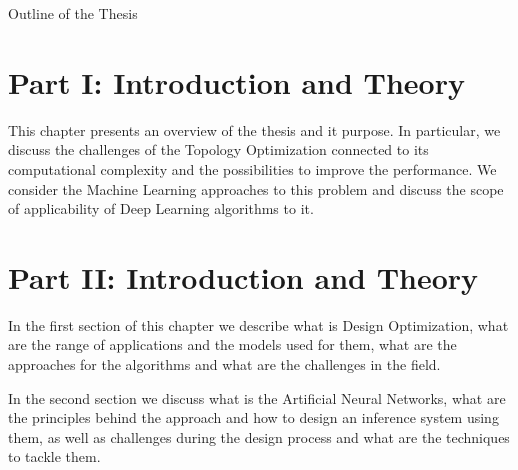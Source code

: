 \clearemptydoublepage

{}

\begin{center}
	\huge{Outline of the Thesis}
\end{center}


\section*{Part I: Introduction and Theory}

  \vspace{1mm}

\noindent  This chapter presents an overview of the thesis and it purpose. 
In particular, we discuss the challenges of the Topology Optimization connected to its computational complexity and the possibilities to improve the performance.
We consider the Machine Learning approaches to this problem and discuss the scope of applicability of Deep Learning algorithms to it.


\section*{Part II: Introduction and Theory}

  \vspace{1mm}

In the first section of this chapter we describe what is Design Optimization, what are the range of applications and the models used for them, what are the approaches for the algorithms and what are the challenges in the field.

In the second section we discuss what is the Artificial Neural Networks, what are the principles behind the approach and how to design an inference system using them, as well as challenges during the design process and what are the techniques to tackle them.


